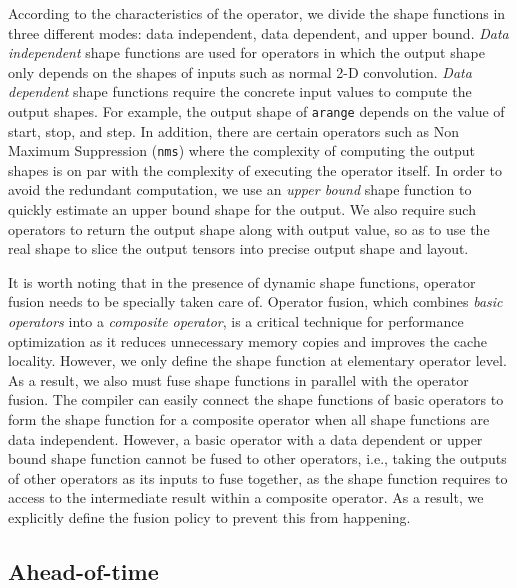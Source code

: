 According to the characteristics of the operator, we divide the shape functions in three
  different modes: data independent, data dependent, and upper bound.
{\em Data independent} shape functions are used for operators in which the output shape
  only depends on the shapes of inputs such as normal 2-D convolution.
{\em Data dependent} shape functions require the concrete input values to compute
  the output shapes. For example, the output shape of \texttt{arange} depends on the value of start, stop, and step.
In addition, there are certain operators such as Non Maximum Suppression (\texttt{nms})
  where the complexity of computing the output shapes is on par with the complexity of executing the operator itself.
In order to avoid the redundant computation, we use an {\em upper bound} shape function to
  quickly estimate an upper bound shape for the output.
We also require such operators to return the output shape along with output value,
  so as to use the real shape to slice the output tensors into precise output shape and layout.

It is worth noting that in the presence of dynamic shape functions, operator fusion
  needs to be specially taken care of.
Operator fusion, which combines {\em basic operators} into a {\em composite operator},
  is a critical technique for performance optimization as it reduces unnecessary memory copies
  and improves the cache locality.
However, we only define the shape function at elementary operator level.
As a result, we also must fuse shape functions in parallel with the operator fusion.
The compiler can easily connect the shape functions of basic operators to form the shape
  function for a composite operator when all shape functions are data independent.
However, a basic operator with a data dependent or upper bound shape function
  cannot be fused to other operators,
  i.e., taking the outputs of other operators as its inputs to fuse together,
  as the shape function requires to access to the intermediate result within a composite operator.
As a result, we explicitly define the fusion policy to prevent this from happening.

\subsection{Ahead-of-time}

